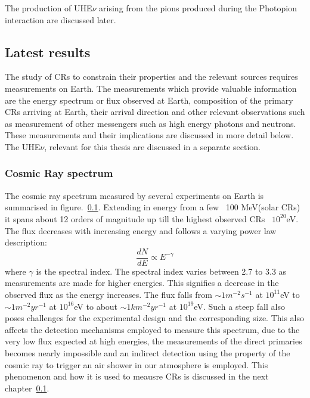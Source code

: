 The production of UHE$\nu$ arising from the pions produced during the Photopion interaction are discussed later. 

\subsection{Latest results}
The study of CRs to constrain their properties and the relevant sources requires measurements on Earth. The measurements which provide valuable information are the energy spectrum or flux observed at Earth, composition of the primary CRs arriving at Earth, their arrival direction and other relevant observations such as measurement of other messengers such as high energy photons and neutrons. These measurements and their implications are discussed in more detail below. The UHE$\nu$, relevant for this thesis are discussed in a separate section. 

\subsubsection*{Cosmic Ray spectrum}
The cosmic ray spectrum measured by several experiments on Earth is summarised in figure.~\ref{}. Extending in energy from a few ~100 MeV(solar CRs) it spans about 12 orders of magnitude up till the highest observed CRs ~$10^{20}$eV. The flux decreases with increasing energy and follows a varying power law description:
\begin{equation}\label{eq:Pdisinteg}
  \frac{dN}{dE} \propto E^{-\gamma}   
\end{equation}
where $\gamma$ is the spectral index. The spectral index varies between 2.7 to 3.3 as measurements are made for higher energies. This signifies a decrease in the observed flux as the energy increases. The flux falls from $\sim 1m^{-2} s^{-1}$ at $10^{11}$eV to $\sim 1m^{-2} yr^{-1}$ at $10^{16}$eV to about $\sim 1km^{-2} yr^{-1}$ at $10^{19}$eV. Such a steep fall also poses challenges for the experimental design and the corresponding size. This also affects the detection mechanisms employed to measure this spectrum, due to the very low flux expected at high energies, the measurements of the direct primaries becomes nearly impossible and an indirect detection using the property of the cosmic ray to trigger an air shower in our atmosphere is employed. This phenomenon and how it is used to meausre CRs is discussed in the next chapter~\ref{}.

